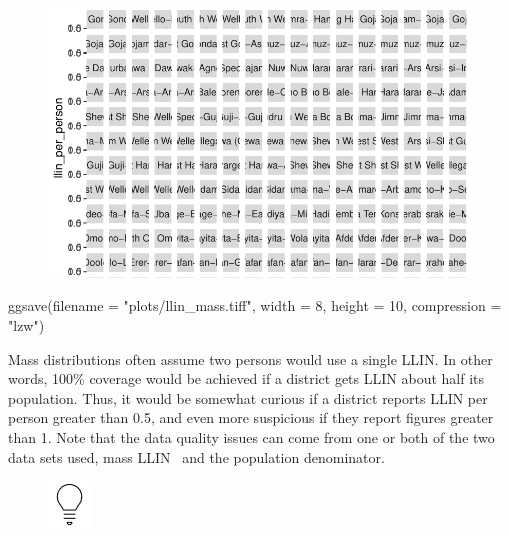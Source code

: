 \documentclass[
  letterpaper,
  DIV=11,
  numbers=noendperiod]{scrreprt}
\newenvironment{Shaded}{\begin{snugshade}}{\end{snugshade}}
\newcommand{\AttributeTok}[1]{\textcolor[rgb]{0.40,0.45,0.13}{#1}}
\newcommand{\DecValTok}[1]{\textcolor[rgb]{0.68,0.00,0.00}{#1}}
\newcommand{\FunctionTok}[1]{\textcolor[rgb]{0.28,0.35,0.67}{#1}}
\newcommand{\NormalTok}[1]{\textcolor[rgb]{0.00,0.23,0.31}{#1}}
\newcommand{\StringTok}[1]{\textcolor[rgb]{0.13,0.47,0.30}{#1}}
\begin{document}
\begin{figure}[H]

{\centering \includegraphics{module_01_files/figure-pdf/unnamed-chunk-3-1.pdf}

}

\end{figure}

\begin{Shaded}
\begin{Highlighting}[]
  \FunctionTok{ggsave}\NormalTok{(}\AttributeTok{filename =} \StringTok{"plots/llin\_mass.tiff"}\NormalTok{,}
         \AttributeTok{width =} \DecValTok{8}\NormalTok{, }\AttributeTok{height =} \DecValTok{10}\NormalTok{, }\AttributeTok{compression =} \StringTok{"lzw"}\NormalTok{)}
\end{Highlighting}
\end{Shaded}

Mass distributions often assume two persons would use a single LLIN. In
other words, 100\% coverage would be achieved if a district gets LLIN
about half its population. Thus, it would be somewhat curious if a
district reports LLIN per person greater than 0.5, and even more
suspicious if they report figures greater than 1. Note that the data
quality issues can come from one or both of the two data sets used, mass
LLIN~ and the population denominator.

\begin{figure}

\includegraphics{plots/image_01.png} \hfill{}

\end{figure}
\end{document}
